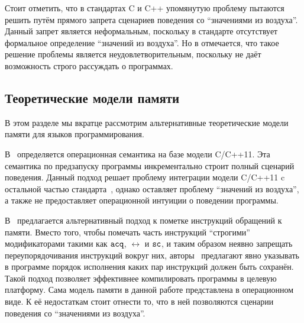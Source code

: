 
Стоит отметить, что в стандартах C \cite{C:11} и C++ \cite{CPP:11, CPP:14} упомянутую проблему пытаются решить
путём прямого запрета сценариев поведения со ``значениями из воздуха''.
Данный запрет является неформальным, поскольку в стандарте отсутствует формальное определение
``значений из воздуха''.
Но в \cite{Boehm-Demsky:MSPC14} отмечается, что такое решение проблемы
является неудовлетворительным, поскольку не даёт возможность строго рассуждать
о программах.


\subsection{Теоретические модели памяти}
В этом разделе мы вкратце рассмотрим альтернативные теоретические модели памяти для языков программирования.

В~\cite{Nienhuis-al:OOPSLA16} определяется операционная семантика на базе модели C/C++11.
Эта семантика по предзапуску программы инкрементально строит полный сценарий поведения.
Данный подход решает проблему интеграции модели C/C++11 c
остальной частью стандарта~\cite{Memarian-al:PLDI16},
однако оставляет проблему ``значений из воздуха'', а также не предоставляет операционной интуиции
о поведении программы.

В~\cite{Crary-Sullivan:POPL15} предлагается альтернативный подход к пометке инструкций обращений к памяти.
Вместо того, чтобы помечать часть инструкций ``строгими'' модификаторами такими как ${\mathtt{acq}}$, $\rel$ и ${\mathtt{sc}}$,
и таким образом неявно запрещать переупорядочивания инструкций вокруг них,
авторы~\cite{Crary-Sullivan:POPL15} предлагают
явно указывать в программе порядок исполнения каких пар инструкций должен быть сохранён.
Такой подход позволяет эффективнее компилировать программы в целевую платформу.
Сама модель памяти в данной работе представлена в операционном виде.
К её недостаткам стоит отнести то, что в ней позволяются сценарии поведения со ``значениями из воздуха''.

